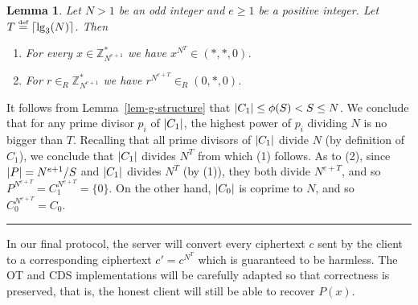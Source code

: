\documentclass[11pt]{article}
\newtheorem{lemma}[theorem]{Lemma}
\newenvironment{proof}{\noindent {\bf Proof:} \hspace{.677em}}%
                     {\qed}
\newcommand{\qed}{\hspace*{\fill}\rule{0.6em}{0.6em}}
\newcommand{\U}[1]{\mathbb{Z}_{#1}^*}
\newcommand{\mathify}[1]{\ifmmode{#1}\else\mbox{$#1$}\fi}
\newcommand{\size}[1]{\mathify{\left| #1 \right|}}
\newcommand{\ceil}[1]{\mathify{\left\lceil{#1}\right\rceil}}
\newcommand{\eqdef}{\stackrel{\mbox{\tiny def}}{{=}}}
\begin{document}
\begin{lemma}
\label{lem-proj} Let $N>1$ be an odd integer and $e\ge 1$ be a
positive integer. Let $T\eqdef\ceil{\lg_3(N)}$. Then
\begin{enumerate}
  \item For every $x\in\U{N^{e+1}}$ we have $x^{N^T}\in(*,*,0)$.
  \item For $r\in_R\U{N^{e+1}}$ we have $r^{N^{e+T}}\in_R(0,*,0)$.
\end{enumerate}
\end{lemma}
\begin{proof}
It follows from Lemma~\ref{lem-g-structure} that $\size{C_1}\leq
\phi(S)<S\leq N$. We conclude that for any prime divisor $p_i$ of
$\size{C_1}$, the highest power of $p_i$ dividing $N$ is no bigger
than $T$. Recalling that all prime divisors of $\size{C_1}$ divide
$N$ (by definition of $C_1$), we conclude that $\size{C_1}$ divides
$N^T$ from which (1) follows. As to (2), since $\size{P}=N^{e+1}/S$
and $\size{C_1}$ divides $N^T$ (by (1)), they both divide
$N^{e+T}$, and so $P^{N^{e+T}}=C_1^{N^{e+T}}=\{0\}$. On the other
hand, $\size{C_0}$ is coprime to $N$, and so $C_0^{N^{e+T}}=C_0$.
\end{proof}

In our final protocol, the server will convert every ciphertext $c$
sent by the client to a corresponding ciphertext $c'=c^{N^T}$ which
is guaranteed to be harmless. The OT and CDS implementations will
be carefully adapted so that correctness is preserved, that is, the
honest client will still be able to recover $P(x)$.
\end{document}
